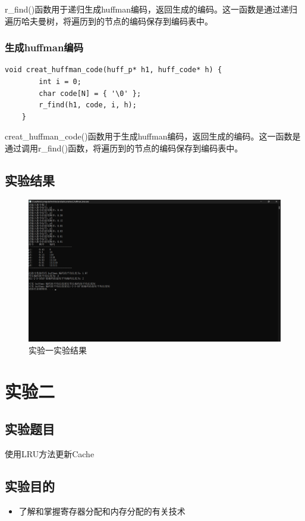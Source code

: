\documentclass[UTF8,12pt]{article}
\begin{document}
r\_find()函数用于递归生成huffman编码，返回生成的编码。这一函数是通过递归遍历哈夫曼树，将遍历到的节点的编码保存到编码表中。

\subsubsection{生成huffman编码}
\begin{lstlisting}[frame=shadowbox] 
    void creat_huffman_code(huff_p* h1, huff_code* h) {
        int i = 0;
        char code[N] = { '\0' };
        r_find(h1, code, i, h);
    }
\end{lstlisting}

creat\_huffman\_code()函数用于生成huffman编码，返回生成的编码。这一函数是通过调用r\_find()函数，将遍历到的节点的编码保存到编码表中。

\newpage

\subsection{实验结果}
\begin{figure}[htbp]
    \centering
    \includegraphics[width=1.0\textwidth]{imgs/2.png}
    \caption{实验一实验结果}
\end{figure}

\newpage

\section{实验二}
\subsection{实验题目}
使用LRU方法更新Cache

\subsection{实验目的}
\begin{itemize}
    \item 了解和掌握寄存器分配和内存分配的有关技术
\end{itemize}
\end{document}
